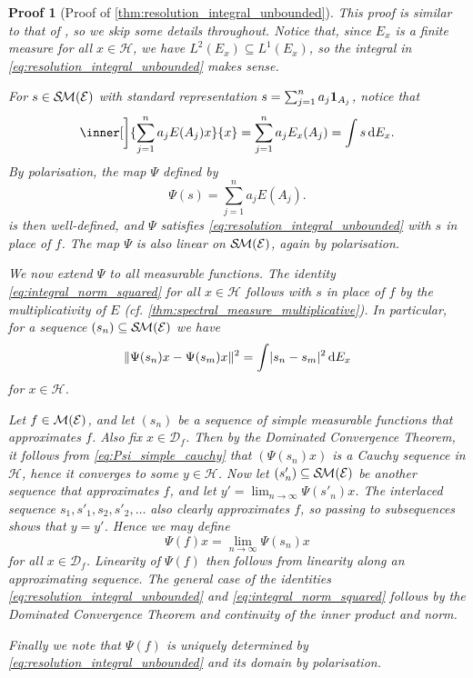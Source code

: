 \documentclass[article, a4paper, 11pt, oneside]{memoir}
\numberwithin{equation}{chapter}
\newcommand{\calH}{\mathcal{H}}
\newcommand{\calE}{\mathcal{E}}
\newcommand{\dom}{\mathcal{D}}
\theoremstyle{myexample}
\theoremstyle{myexample}
\theoremstyle{myexamplebreak}
\theoremstyle{myexamplebreak}
\theoremstyle{nonumberplain}
\theoremstyle{MyNonumberplain}
\newtheorem{proofof}{Proof}
\begin{document}
\begin{proofof}[Proof of \cref{thm:resolution_integral_unbounded}]
    This proof is similar to that of \textcite[Theorem~3.56]{skibsted2019}, so we skip some details throughout. Notice that, since $E_x$ is a finite measure for all $x \in \calH$, we have $L^2(E_x) \subseteq L^1(E_x)$, so the integral in \eqref{eq:resolution_integral_unbounded} makes sense.
    
    For $s \in \simplemeas(\calE)$ with standard representation $s = \sum_{j=1}^n a_j \mathbf{1}_{A_j}$, notice that 
    \begin{equation*}
        \inner[\bigg]{ \sum_{j=1}^n a_j E(A_j) x}{x}
            = \sum_{j=1}^n a_j E_x(A_j)
            = \int s \dif E_x.
    \end{equation*}
    By polarisation, the map $\Psi$ defined by
    \begin{equation*}
        \Psi(s) = \sum_{j=1}^n a_j E(A_j).
    \end{equation*}
    is then well-defined, and $\Psi$ satisfies \eqref{eq:resolution_integral_unbounded} with $s$ in place of $f$. The map $\Psi$ is also linear on $\simplemeas(\calE)$, again by polarisation.
    
    We now extend $\Psi$ to all measurable functions. The identity \eqref{eq:integral_norm_squared} for all $x \in \calH$ follows with $s$ in place of $f$ by the multiplicativity of $E$ (cf. \cref{thm:spectral_measure_multiplicative}). In particular, for a sequence $(s_n) \subseteq \simplemeas(\calE)$ we have
    \begin{equation}
        \label{eq:Psi_simple_cauchy}
        \lVert\Psi(s_n)x - \Psi(s_m)x\rVert^2
            = \int \lvert s_n - s_m\rvert^2 \mathop{}\!\mathrm{d} E_x
    \end{equation}
    for $x \in \calH$.
    
    Let $f \in \measurable(\calE)$, and let $(s_n)$ be a sequence of simple measurable functions that approximates $f$. Also fix $x \in \dom_f$. Then by the Dominated Convergence Theorem, it follows from \eqref{eq:Psi_simple_cauchy} that $(\Psi(s_n)x)$ is a Cauchy sequence in $\calH$, hence it converges to some $y \in \calH$. Now let $(s'_n) \subseteq \simplemeas(\calE)$ be another sequence that approximates $f$, and let $y' = \lim_{n \to \infty} \Psi(s'_n)x$. The interlaced sequence $s_1, s'_1, s_2, s'_2, \ldots$ also clearly approximates $f$, so passing to subsequences shows that $y = y'$. Hence we may define
    \begin{equation}
        \label{eq:psi_strong_definition}
        \Psi(f)x = \lim_{n \to \infty} \Psi(s_n)x
    \end{equation}
    for all $x \in \dom_f$. Linearity of $\Psi(f)$ then follows from linearity along an approximating sequence. The general case of the identities \eqref{eq:resolution_integral_unbounded} and \eqref{eq:integral_norm_squared} follows by the Dominated Convergence Theorem and continuity of the inner product and norm.
    
    Finally we note that $\Psi(f)$ is uniquely determined by \eqref{eq:resolution_integral_unbounded} and its domain by polarisation.
\end{proofof}
\end{document}
